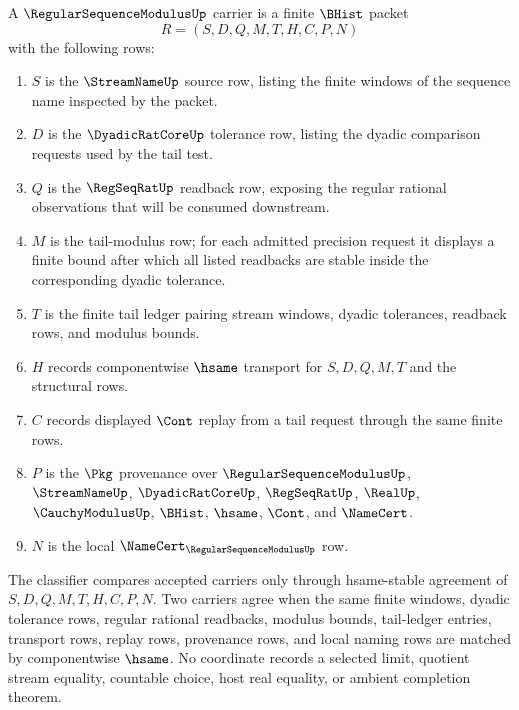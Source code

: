 \begin{definition}
\label{def:regular-sequence-modulus-carrier}
A $\RegularSequenceModulusUp$ carrier is a finite $\BHist$ packet
$$
R=(S,D,Q,M,T,H,C,P,N)
$$
with the following rows:
\begin{enumerate}
\item $S$ is the $\StreamNameUp$ source row, listing the finite windows of the sequence name inspected by the packet.
\item $D$ is the $\DyadicRatCoreUp$ tolerance row, listing the dyadic comparison requests used by the tail test.
\item $Q$ is the $\RegSeqRatUp$ readback row, exposing the regular rational observations that will be consumed downstream.
\item $M$ is the tail-modulus row; for each admitted precision request it displays a finite bound after which all listed readbacks are stable inside the corresponding dyadic tolerance.
\item $T$ is the finite tail ledger pairing stream windows, dyadic tolerances, readback rows, and modulus bounds.
\item $H$ records componentwise $\hsame$ transport for $S,D,Q,M,T$ and the structural rows.
\item $C$ records displayed $\Cont$ replay from a tail request through the same finite rows.
\item $P$ is the $\Pkg$ provenance over $\RegularSequenceModulusUp$, $\StreamNameUp$, $\DyadicRatCoreUp$, $\RegSeqRatUp$, $\RealUp$, $\CauchyModulusUp$, $\BHist$, $\hsame$, $\Cont$, and $\NameCert$.
\item $N$ is the local $\NameCert_{\RegularSequenceModulusUp}$ row.
\end{enumerate}
The classifier compares accepted carriers only through hsame-stable agreement of $S,D,Q,M,T,H,C,P,N$. Two carriers agree when the same finite windows, dyadic tolerance rows, regular rational readbacks, modulus bounds, tail-ledger entries, transport rows, replay rows, provenance rows, and local naming rows are matched by componentwise $\hsame$. No coordinate records a selected limit, quotient stream equality, countable choice, host real equality, or ambient completion theorem.
\end{definition}

